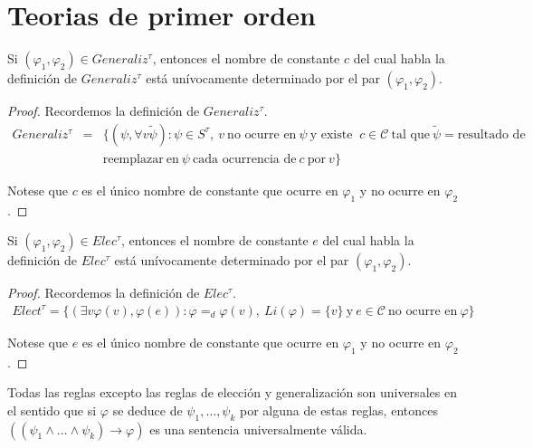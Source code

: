 \section{Teorias de primer orden}

  \begin{lemma} \label{lemma_65}
    \PN Si $(\varphi_{1}, \varphi_{2}) \in Generaliz^{\tau}$, entonces el nombre de constante $c$ del cual habla la
    definición de $Generaliz^{\tau}$ está unívocamente determinado por el par $(\varphi_{1}, \varphi_{2})$.
  \end{lemma}
  \begin{proof}
    \PN Recordemos la definición de $Generaliz^{\tau}$.
    \begin{eqnarray*}
      Generaliz^{\tau} &=& \{(\psi, \forall v \tilde{\psi}): \psi \in S^{\tau}, \ v \ \text{no ocurre en} \ \psi \
      \text{y existe } \ c \in \mathcal{C} \ \text{tal que} \ \tilde{\psi} = \text{resultado de} \\
      && \text{reemplazar} \ \text{en} \ \psi \ \text{cada ocurrencia de} \ c \ \text{por} \ v\}
    \end{eqnarray*}

    \PN Notese que $c$ es el único nombre de constante que ocurre en $\varphi_{1}$ y no ocurre en $\varphi_{2}$.
  \end{proof}

  \begin{lemma} \label{lemma_66}
    \PN Si $(\varphi_{1}, \varphi_{2}) \in Elec^{\tau}$, entonces el nombre de constante $e$ del cual habla la
    definición de $Elec^{\tau}$ está unívocamente determinado por el par $(\varphi_{1}, \varphi_{2})$.
  \end{lemma}
  \begin{proof}
    \PN Recordemos la definición de $Elec^{\tau}$.
    \begin{eqnarray*}
      Elect^{\tau} = \{(\exists v \varphi(v), \varphi(e)): \varphi =_{d} \varphi(v), \ Li(\varphi) = \{v\} \ \text{y} \
      e \in \mathcal{C} \ \text{no ocurre en} \ \varphi\}
    \end{eqnarray*}

    \PN Notese que $e$ es el único nombre de constante que ocurre en $\varphi_{1}$ y no ocurre en $\varphi_{2}$.
  \end{proof}

  \begin{lemma} \label{lemma_67}
    \PN Todas las reglas excepto las reglas de elección y generalización son universales en el sentido que si $\varphi$
    se deduce de $\psi_{1}, \dotsc, \psi_{k}$ por alguna de estas reglas, entonces $\left((\psi_{1} \wedge \dotsc \wedge
    \psi_{k}) \rightarrow \varphi \right)$ es una sentencia universalmente válida.
  \end{lemma}

